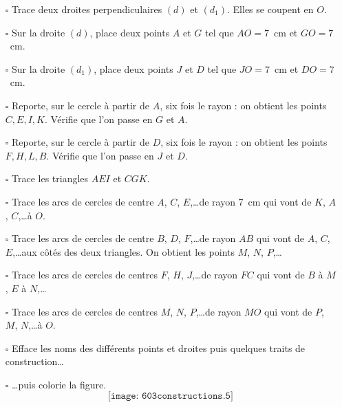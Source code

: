 \begin{itemize}
\item[$\square$] Trace deux droites perpendiculaires $(d)$ et $(d_1)$. Elles se coupent en $O$.
\item[$\square$] Sur la droite $(d)$, place deux points $A$ et $G$ tel que $AO=7$~cm et $GO=7$~cm.
\item[$\square$] Sur la droite $(d_1)$, place deux points $J$ et $D$ tel que $JO=7$~cm et $DO=7$~cm.
\item[$\square$] Reporte, sur le cercle à partir de $A$, six fois le rayon : on obtient les points $C,E,I,K$. Vérifie que l'on passe en $G$ et $A$.
\item[$\square$] Reporte, sur le cercle à partir de $D$, six fois le rayon : on obtient les points $F,H,L,B$. Vérifie que l'on passe en $J$ et $D$.
\item[$\square$] Trace les triangles $AEI$ et $CGK$.
\item[$\square$] Trace les arcs de cercles de centre $A$, $C$, $E$,\ldots de rayon 7~cm qui vont de $K$, $A$, $C$,\ldots à $O$.
\item[$\square$] Trace les arcs de cercles de centre $B$, $D$, $F$,\ldots de rayon $AB$ qui vont de $A$, $C$, $E$,\ldots aux côtés des deux triangles. On obtient les points $M$, $N$, $P$,\ldots
\item[$\square$] Trace les arcs de cercles de centres $F$, $H$, $J$,\ldots de rayon $FC$ qui vont de $B$ à $M$, $E$ à $N$,\ldots
\item[$\square$] Trace les arcs de cercles de centres $M$, $N$, $P$,\ldots de rayon $MO$ qui vont de $P$, $M$, $N$,\ldots à $O$.
\item[$\square$] Efface les noms des différents points et droites puis quelques traits de construction\ldots
\item[$\square$] \ldots puis colorie la figure.
\[\texttt{[image: 603constructions.5]}\]
\end{itemize}
